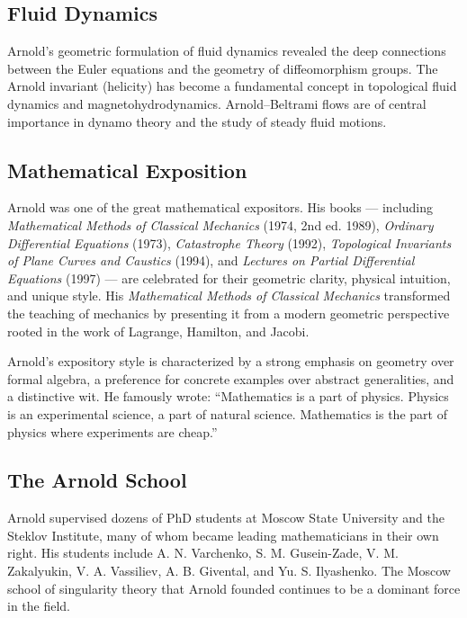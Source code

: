 \subsection{Fluid Dynamics}

Arnold's geometric formulation of fluid dynamics revealed the deep connections between the Euler equations and the geometry of diffeomorphism groups. The Arnold invariant (helicity) has become a fundamental concept in topological fluid dynamics and magnetohydrodynamics. Arnold--Beltrami flows are of central importance in dynamo theory and the study of steady fluid motions.

\subsection{Mathematical Exposition}

Arnold was one of the great mathematical expositors. His books --- including \textit{Mathematical Methods of Classical Mechanics} (1974, 2nd ed. 1989), \textit{Ordinary Differential Equations} (1973), \textit{Catastrophe Theory} (1992), \textit{Topological Invariants of Plane Curves and Caustics} (1994), and \textit{Lectures on Partial Differential Equations} (1997) --- are celebrated for their geometric clarity, physical intuition, and unique style. His \textit{Mathematical Methods of Classical Mechanics} transformed the teaching of mechanics by presenting it from a modern geometric perspective rooted in the work of Lagrange, Hamilton, and Jacobi.

Arnold's expository style is characterized by a strong emphasis on geometry over formal algebra, a preference for concrete examples over abstract generalities, and a distinctive wit. He famously wrote: ``Mathematics is a part of physics. Physics is an experimental science, a part of natural science. Mathematics is the part of physics where experiments are cheap.''

\subsection{The Arnold School}

Arnold supervised dozens of PhD students at Moscow State University and the Steklov Institute, many of whom became leading mathematicians in their own right. His students include A. N. Varchenko, S. M. Gusein-Zade, V. M. Zakalyukin, V. A. Vassiliev, A. B. Givental, and Yu. S. Ilyashenko. The Moscow school of singularity theory that Arnold founded continues to be a dominant force in the field.


